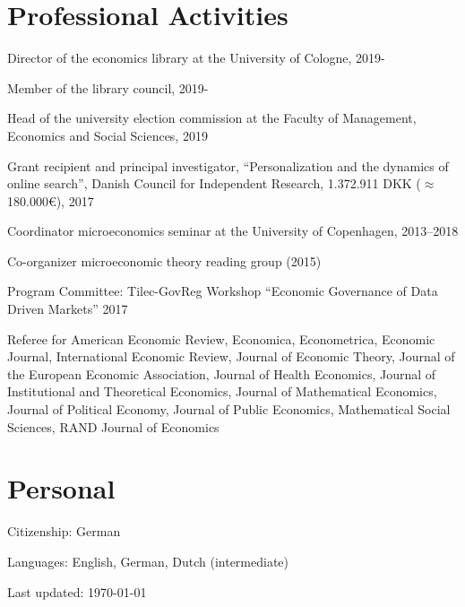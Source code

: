 \documentclass[a4paper]{article}
\def\footerlink{}
\renewenvironment{itemize}{
  \begin{list}{}{
    \setlength{\leftmargin}{1.5em}
  }
}{
  \end{list}
}
\begin{document}
\section*{Professional Activities}
\begin{itemize}
\item Director of the economics library at the University of Cologne, 2019-
\item Member of the library council, 2019-
  \item Head of the university election commission at the Faculty of Management, Economics and Social Sciences, 2019
\item Grant recipient and principal investigator, ``Personalization and the dynamics of online search'', Danish Council for Independent Research, 1.372.911 DKK ($\approx$180.000\euro), 2017
\item Coordinator microeconomics seminar at the University of Copenhagen, 2013--2018
\item Co-organizer microeconomic theory reading group (2015)
  \item Program Committee: Tilec-GovReg Workshop ``Economic Governance of Data Driven Markets'' 2017
\item Referee for American Economic Review, Economica, Econometrica, Economic Journal, International Economic Review, Journal of Economic Theory, Journal of the European Economic Association, Journal of Health Economics, Journal of Institutional and Theoretical Economics, Journal of Mathematical Economics, Journal of Political Economy, Journal of Public Economics, Mathematical Social Sciences, RAND Journal of Economics
\end{itemize}


\section*{Personal}

\begin{itemize}
\item Citizenship: German
\item Languages: English, German, Dutch (intermediate)
\end{itemize}


\null\vfill %
\begin{center}
  \begin{footnotesize}
    Last updated: \today \\
    \href{\footerlink}{\texttt{\footerlink}}
  \end{footnotesize}
\end{center}
\end{document}
